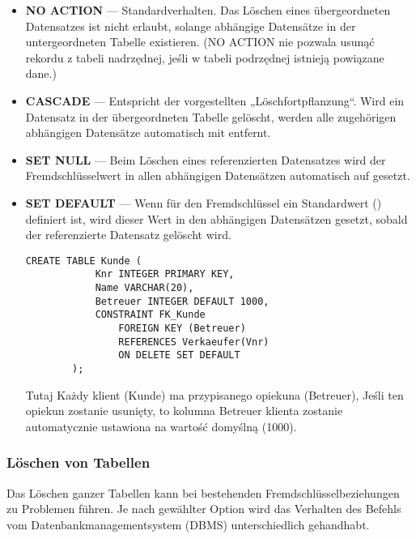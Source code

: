 \begin{itemize}
    \item \textbf{NO ACTION} — Standardverhalten. 
    Das Löschen eines übergeordneten Datensatzes ist nicht erlaubt, 
    solange abhängige Datensätze in der untergeordneten Tabelle existieren. (NO ACTION nie pozwala usunąć rekordu z tabeli nadrzędnej, jeśli w tabeli podrzędnej istnieją powiązane dane.)
    
    \item \textbf{CASCADE} — Entspricht der vorgestellten „Löschfortpflanzung“. 
    Wird ein Datensatz in der übergeordneten Tabelle gelöscht, 
    werden alle zugehörigen abhängigen Datensätze automatisch mit entfernt.
    
    \item \textbf{SET NULL} — Beim Löschen eines referenzierten Datensatzes 
    wird der Fremdschlüsselwert in allen abhängigen Datensätzen automatisch auf  gesetzt.
    
    \item \textbf{SET DEFAULT} — Wenn für den Fremdschlüssel ein Standardwert () definiert ist, 
    wird dieser Wert in den abhängigen Datensätzen gesetzt, 
    sobald der referenzierte Datensatz gelöscht wird.

    \begin{lstlisting}[style=sqlstyle]
        CREATE TABLE Kunde (
            Knr INTEGER PRIMARY KEY,
            Name VARCHAR(20),
            Betreuer INTEGER DEFAULT 1000,
            CONSTRAINT FK_Kunde
                FOREIGN KEY (Betreuer)
                REFERENCES Verkaeufer(Vnr)
                ON DELETE SET DEFAULT
        );
    \end{lstlisting}
        Tutaj Każdy klient (Kunde) ma przypisanego opiekuna (Betreuer), Jeśli ten opiekun zostanie usunięty, to kolumna Betreuer klienta zostanie automatycznie ustawiona na wartość domyślną (1000).
    \end{itemize}
\subsubsection{Löschen von Tabellen}

Das Löschen ganzer Tabellen kann bei bestehenden Fremdschlüsselbeziehungen zu Problemen führen. 
Je nach gewählter Option wird das Verhalten des Befehls  vom Datenbankmanagementsystem (DBMS) unterschiedlich gehandhabt.


